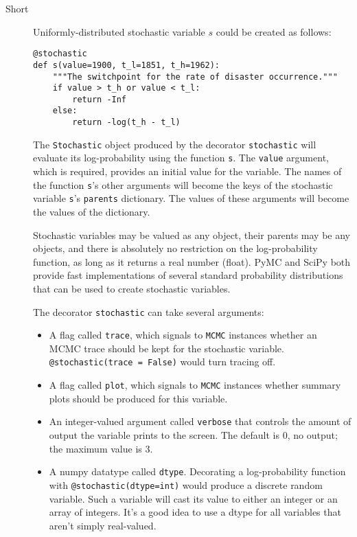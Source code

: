 \begin{description}
    
    \item[Short] Uniformly-distributed stochastic variable $s$ could be created as follows:
    \begin{verbatim}
@stochastic
def s(value=1900, t_l=1851, t_h=1962):
    """The switchpoint for the rate of disaster occurrence."""
    if value > t_h or value < t_l:
        return -Inf
    else:
        return -log(t_h - t_l) 
    \end{verbatim}
    The \texttt{Stochastic} object produced by the decorator \texttt{stochastic} will evaluate its log-probability using the function \texttt{s}. The \texttt{value} argument, which is required, provides an initial value for the variable. The names of the function \texttt{s}'s other arguments will become the keys of the stochastic variable \texttt{s}'s \texttt{parents} dictionary. The values of these arguments will become the values of the dictionary.

Stochastic variables may be valued as any object, their parents may be any objects, and there is absolutely no restriction on the log-probability function, as long as it returns a real number (float). PyMC and SciPy both provide fast implementations of several standard probability distributions that can be used to create stochastic variables.

    The decorator \texttt{stochastic} can take several arguments: 
    \begin{itemize}
        \item A flag called \texttt{trace}, which signals to \texttt{MCMC} instances whether an MCMC trace should be kept for the stochastic variable. \texttt{@stochastic(trace = False)} would turn tracing off.
        \item A flag called \texttt{plot}, which signals to \texttt{MCMC} instances whether summary plots should be produced for this variable.
        \item An integer-valued argument called \texttt{verbose} that controls the amount of output the variable prints to the screen. The default is $0$, no output; the maximum value is 3. 
        \item A numpy datatype called \texttt{dtype}. Decorating a log-probability function with \texttt{@stochastic(dtype=int)} would produce a discrete random variable. Such a variable will cast its value to either an integer or an array of integers. It's a good idea to use a dtype for all variables that aren't simply real-valued.
    \end{itemize} 
    


\end{description}
